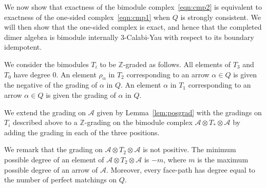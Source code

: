 \documentclass{article}
\theoremstyle{definition}
\newcommand{\A}{{\mathcal A}}
\begin{document}
We now show that exactness of the bimodule complex~\eqref{eqn:cmp2} is equivalent to exactness of the one-sided complex~\eqref{eqn:cmp1} when $Q$ is strongly consistent. We will then show that the one-sided complex is exact, and hence that the completed dimer algebra is bimodule internally 3-Calabi-Yau with respect to its boundary idempotent.

We consider the bimodules $T_i$ to be $\mathbb Z$-graded as follows. All elements of $T_3$ and $T_0$ have degree 0. An element $\rho_\alpha$ in $T_2$ corresponding to an arrow $\alpha\in Q$ is given the negative of the grading of $\alpha$ in $Q$. An element $\alpha$ in $T_1$ corresponding to an arrow $\alpha\in Q$ is given the grading of $\alpha$ in $Q$.

We extend the grading on $\A$ given by Lemma~\ref{lem:posgrad} with the gradings on $T_i$ described above to a $\mathbb Z$-grading on the bimodule complex $\A\otimes T_*\otimes \A$ by adding the grading in each of the three positions. 

We remark that the grading on $\A\otimes T_2\otimes \A$ is not positive. The minimum possible degree of an element of $\A\otimes T_2\otimes \A$ is $-m$, where $m$ is the maximum possible degree of an arrow of $\A$.
Moreover, every face-path has degree equal to the number of perfect matchings on $Q$.
\end{document}
